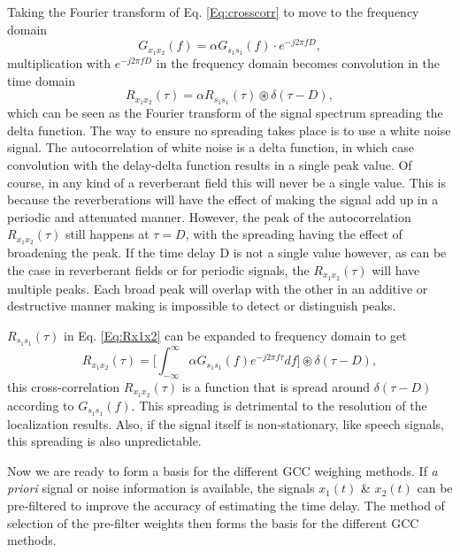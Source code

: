 Taking the Fourier transform of Eq. \ref{Eq:crosscorr} to move to the frequency domain
\begin{equation}
        G_{x_1x_2}(f) = \alpha G_{s_1s_1}(f)\cdot e^{-j2\pi fD},
        \label{Eq:Gx1x2Gs1s1}
\end{equation}
multiplication with $e^{-j2\pi fD}$ in the frequency domain becomes convolution in the time domain
\begin{equation}
        R_{x_1x_2}(\tau) = \alpha R_{s_1s_1}(\tau) \circledast\delta(\tau - D),
        \label{Eq:Rx1x2}
\end{equation}
which can be seen as the Fourier transform of the signal spectrum spreading the delta function. The way to ensure no spreading takes place is to use a white noise signal. The autocorrelation of white noise is a delta function, in which case convolution with the delay-delta function results in a single peak value. Of course, in any kind of a reverberant field this will never be a single value. This is because the reverberations will have the effect of making the signal add up in a periodic and attenuated manner. However, the peak of the autocorrelation $R_{x_1x_2}(\tau)$ still happens at $\tau = D$, with the spreading having the effect of broadening the peak. If the time delay D is not a single value however, as can be the case in reverberant fields or for periodic signals, the $R_{x_1x_2}(\tau)$ will have multiple peaks. Each broad peak will overlap with the other in an additive or destructive manner making is impossible to detect or distinguish peaks. 

$R_{s_1s_1}(\tau)$ in Eq. \ref{Eq:Rx1x2} can be expanded to frequency domain to get
\begin{equation}
        R_{x_1x_2}(\tau) =  {\bigg[\int_{-\infty}^{\infty}\alpha{G}_{s_1s_1}(f) e^{-j2\pi f\tau} df\bigg]} \circledast\delta(\tau - D),
\end{equation}
this cross-correlation $R_{x_1x_2}(\tau)$ is a function that is spread around $\delta(\tau - D)$ according to ${G}_{s_1s_1}(f)$. This spreading is detrimental to the resolution of the localization results. Also, if the signal itself is non-stationary, like speech signals, this spreading is also unpredictable.

Now we are ready to form a basis for the different GCC weighing methods. If \textit{a priori} signal or noise information is available, the signals  $x_1(t)$ \& $x_2(t)$ can be pre-filtered to improve the accuracy of estimating the time delay. The method of selection of the pre-filter weights then forms the basis for the different GCC methods. 

